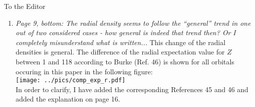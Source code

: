 \documentclass[DIN,pagenumber=false,parskip=half,fromalign=left,fromphone=false,fromemail=true,fromurl=false,fromlogo=false,fromrule=false]{scrlttr2}
\begin{document}
\begin{letter}{To the Editor}
\begin{enumerate}
       result in a numerical error of \unit[2.5]{\%} for strontium
       and \unit[3.0]{\%}
       However, since this observation is not based on physical
       reasoning but only on two numerical data points, I will only indicate that
       this assignment may give an idea about the numerical error and leave the prove
       to future studies to be based on a robust data set.
 \item \emph{Page 9, bottom: The radial density seems to follow the ``general''
             trend in one out of two considered cases - how general is indeed that
             trend then? Or I completely misunderstand what is written... } \newline
             This change of the radial densities is general.
             The difference of the radial expectation value for $Z$ between
             1 and 118 according to Burke
             (Ref. 46) is shown for all orbitals occuring in this paper in the
             following figure:\\
             \texttt{[image: ../pics/comp\_exp\_r.pdf]}\\
             In order to clarify, I have added the corresponding References 45 and 46
             and added the explanation on page 16.
             

\end{enumerate}
\end{letter}
\end{document}
